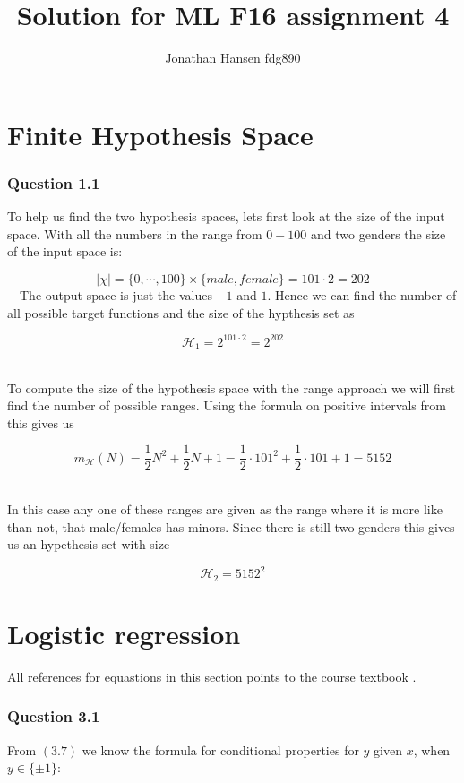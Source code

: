 \documentclass{article}
\begin{document}
\title{Solution for ML F16 assignment 4}
\author{Jonathan Hansen fdg890}
\maketitle

\section{Finite Hypothesis Space}
\subsubsection*{Question 1.1}

To help us find the two hypothesis spaces, lets first look at the size of the
input space. With all the numbers in the range from \(0-100\) and two genders
the size of the input space is:

\[
\left\vert\chi\right\vert = \{0,\cdots,100\} \times \{male,female\} = 101 \cdot 2 = 202
\]
\
\
The output space is just the values \(-1\) and \(1\). Hence we can find the
number of all possible target functions and the size of the hypthesis set as

\[
\mathcal{H}_1 = 2^{101 \cdot 2} = 2^{202}
\]
\
\

To compute the size of the hypothesis space with the range approach we will
first find the number of possible ranges. Using the formula on positive
intervals from \cite{abu2012learning} this gives us

\[
m_{\mathcal{H}}(N)= \dfrac{1}{2}N^2 + \dfrac{1}{2}N + 1 = \dfrac{1}{2}\cdot 101^2
+ \dfrac{1}{2} \cdot 101 + 1 = 5152
\]
\
\

In this case any one of these ranges are given as the range where it is more
like than not, that male/females has minors. Since there is still two genders
this gives us an hypethesis set with size

\[
\mathcal{H}_2 = 5152^2
\]


\section{Logistic regression}
All references for equastions in this section points to the course textbook
\cite{abu2012learning}.

\subsubsection*{Question 3.1}
From \((3.7)\) we know the formula for conditional properties for
\(y\) given \(x\), when \(y \in \{\pm 1\}\):
\end{document}
